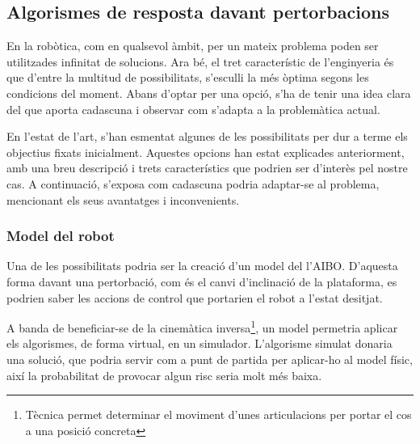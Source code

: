 \documentclass[12pt,a4paper,final,twoside]{article}
\begin{document}



\subsection{Algorismes de resposta davant pertorbacions}
\label{Algorismes}

En la robòtica, com en qualsevol àmbit, per un mateix problema poden ser utilitzades infinitat de solucions. Ara bé, el tret característic de l'enginyeria és que d'entre la multitud de possibilitats, s'esculli la més òptima segons les condicions del moment. Abans d'optar per una opció, s'ha de tenir una idea clara del que aporta cadascuna i observar com s'adapta a la problemàtica actual.

En l'estat de l'art, s'han esmentat algunes de les possibilitats per dur a terme els objectius fixats inicialment. Aquestes opcions han estat explicades anteriorment, amb una breu descripció i trets característics que podrien ser d'interès pel nostre cas. A continuació, s'exposa com cadascuna podria adaptar-se al problema, mencionant els seus avantatges i inconvenients.

\subsubsection{Model del robot}

Una de les possibilitats podria ser la creació d'un model del l'AIBO. D'aquesta forma davant una pertorbació, com és el canvi d'inclinació de la plataforma, es podrien saber les accions de control que portarien el robot a l'estat desitjat.

A banda de beneficiar-se de la cinemàtica inversa\footnote{Tècnica permet determinar el moviment d'unes articulacions per portar el cos a una posició concreta}, un model permetria aplicar els algorismes, de forma virtual, en un simulador. L'algorisme simulat donaria una solució, que podria servir com a punt de partida per aplicar-ho al model físic, així la probabilitat de provocar algun risc seria molt més baixa.
\end{document}
